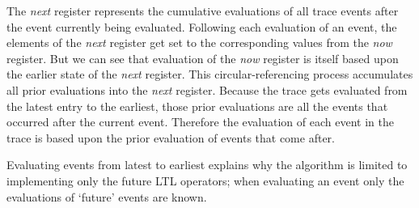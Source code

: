 The \textit{next} register represents the cumulative evaluations of all trace events after the event currently being evaluated.  Following each evaluation of an event, the elements of the \textit{next} register get set to the corresponding values from the \textit{now} register.  But we can see that evaluation of the \textit{now} register is itself based upon the earlier state of the \textit{next} register.  This circular-referencing process accumulates all prior evaluations into the \textit{next} register.  Because the trace gets evaluated from the latest entry to the earliest, those prior evaluations are all the events that occurred after the current event.  Therefore the evaluation of each event in the trace is based upon the prior evaluation of events that come after.

Evaluating events from latest to earliest explains why the algorithm is limited to implementing only the future LTL operators; when evaluating an event only the evaluations of `future' events are known.
\newpage
